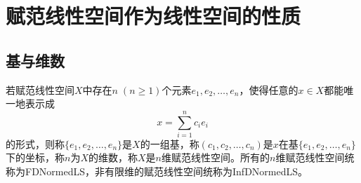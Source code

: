 \section{赋范线性空间作为线性空间的性质}

\subsection{基与维数}
\begin{definition}
	若赋范线性空间$X$中存在$n\;(n\geqslant 1)$个元素$e_1,e_2,\dots,e_n$，使得任意的$x\in X$都能唯一地表示成
	\begin{equation*}
		x=\sum_{i=1}^nc_ie_i
	\end{equation*}
	的形式，则称$\{e_1,e_2,\dots,e_n\}$是$X$的一组基，称$(c_1,c_2,\dots,c_n)$是$x$在基$\{e_1,e_2,\dots,e_n\}$下的坐标，称$n$为$X$的维数，称$X$是$n$维赋范线性空间。所有的$n$维赋范线性空间统称为\gls{FDNormedLS}，非有限维的赋范线性空间统称为\gls{InfDNormedLS}。
\end{definition}

